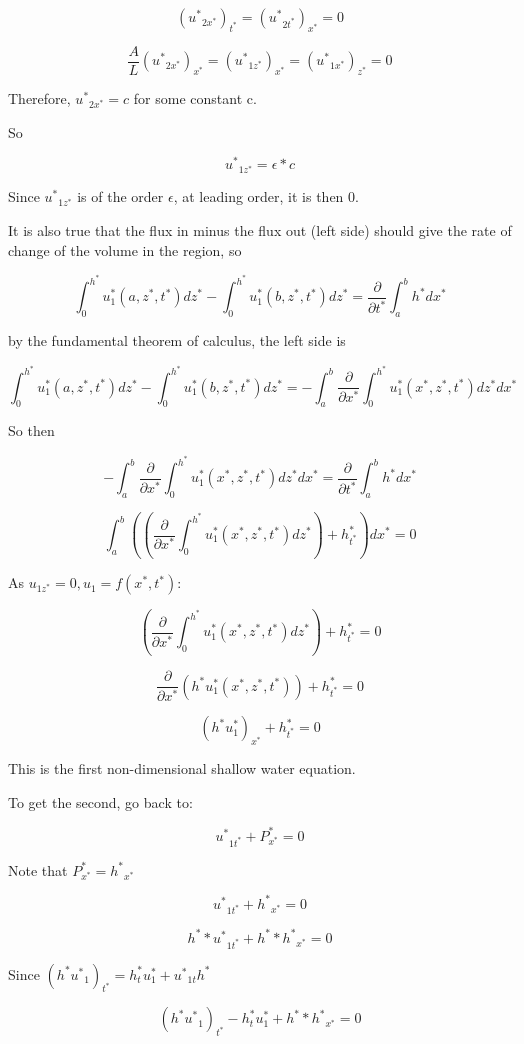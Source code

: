 \documentclass{article}
\begin{document}
$$({u^*}_{2x^*})_{t^*} = ({u^*}_{2t^*})_{x^*} = 0$$

$$ \frac{A}{L}  ({u^*}_{2x^*})_{x^*} = ({u^*}_{1z^*})_{x^*} =  ({u^*}_{1x^*})_{z^*} = 0$$

Therefore,  ${u^*}_{2x^*} = c$ for some constant c. 

So 

$${u^*}_{1z^*} = \epsilon *c$$

Since $ {u^*}_{1z^*}$ is of the order $\epsilon$, at leading order, it is then 0. 

It is also true that the flux in minus the flux out (left side) should give the rate of change of the volume in the region, so

$$\int_0^{h^*} u^*_1(a, z^*, t^*) dz^* - \int_0^{h^*} u^*_1(b, z^*, t^*) dz^* = \frac{\partial}{\partial t^*}\int_a^b h^* dx^* $$ 

by the fundamental theorem of calculus, the left side is

$$\int_0^{h^*} u^*_1(a, z^*, t^*) dz^* - \int_0^{h^*} u^*_1(b, z^*, t^*) dz^* =-\int_a^b \frac{\partial}{\partial x^*} \int_0^{h^*} u^*_1(x^*, z^*, t^*) dz^* dx^*  $$ 

So then

$$-\int_a^b \frac{\partial}{\partial x^*} \int_0^{h^*} u^*_1(x^*, z^*, t^*) dz^* dx^* = \frac{\partial}{\partial t^*}\int_a^b h^* dx^* $$

$$\int_a^b ((\frac{\partial}{\partial x^*} \int_0^{h^*} u^*_1(x^*, z^*, t^*) dz^*) + h^*_{t^*} )dx^* = 0 $$

As $u_{1z^*} = 0, u_1 = f(x^*, t^*)$:

$$(\frac{\partial}{\partial x^*} \int_0^{h^*} u^*_1(x^*, z^*, t^*) dz^*) + h^*_{t^*}  = 0 $$

$$\frac{\partial}{\partial x^*} (h^*u^*_1(x^*, z^*, t^*)) + h^*_{t^*}  = 0 $$

$$ (h^*u^*_1)_{x^*} + h^*_{t^*}  = 0 $$

This is the first non-dimensional shallow water equation.


To get the second, go back to:

$$ {u^*}_{1t^*} +  P^*_{x^*}  = 0   $$

Note that $P^*_{x^*} = {h^*}_{x^*}$

$$ {u^*}_{1t^*} +  {h^*}_{x^*}  = 0   $$

$$ h^**{u^*}_{1t^*} +  h^**{h^*}_{x^*}  = 0   $$

Since $(h^*{u^*}_1)_{t^*} = h^*_t u^*_1 + {u^*}_{1t} h^*$

$$ (h^*{u^*}_1)_{t^*} - h^*_t u^*_1   +  h^**{h^*}_{x^*}  = 0   $$
\end{document}
